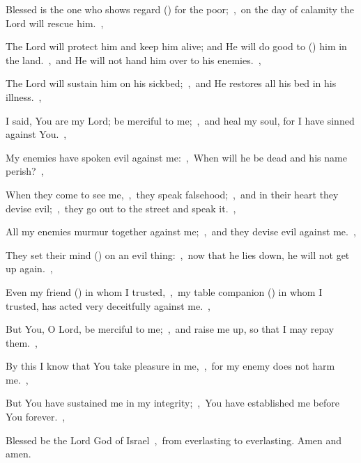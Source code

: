 \documentclass[12pt,twoside,a5paper]{article}
\begin{document}
\begin{normalparskip}
  Blessed is the one who shows regard () for the poor;~\sep\ on the day of calamity the Lord will rescue him.~\sep


  The Lord will protect him and keep him alive; and He will do good to () him in the land.~\sep\ and He will not hand him over to his enemies.~\sep

  The Lord will sustain him on his sickbed;~\sep\ and He restores all his bed in his illness.~\sep

  I said, You are my Lord; be merciful to me;~\sep\ and heal my soul, for I have sinned against You.~\sep

  My enemies have spoken evil against me:~\sep\ When will he be dead and his name perish?~\sep

  When they come to see me,~\sep\ they speak falsehood;~\sep\ and in their heart they devise evil;~\sep\ they go out to the street and speak it.~\sep

  All my enemies murmur together against me;~\sep\ and they devise evil against me.~\sep

  They set their mind () on an evil thing:~\sep\ now that he lies down, he will not get up again.~\sep

  Even my friend () in whom I trusted,~\sep\ my table companion () in whom I trusted, has acted very deceitfully against me.~\sep

  But You, O Lord, be merciful to me;~\sep\ and raise me up, so that I may repay them.~\sep

  By this I know that You take pleasure in me,~\sep\ for my enemy does not harm me.~\sep

  But You have sustained me in my integrity;~\sep\ You have established me before You forever.~\sep

  Blessed be the Lord God of Israel~\sep\ from everlasting to everlasting. Amen and amen.
\end{normalparskip}

\end{document}
